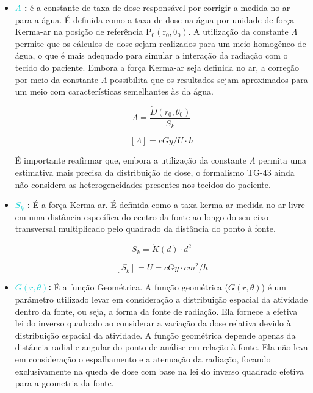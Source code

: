 \documentclass[11pt,a4paper]{article}
\newcounter{exemplo}
\begin{document}
			\begin{exemplo}[onde,]

			\begin{itemize}
				\item \textbf{\textcolor{DarkTurquoise}{$\varLambda$} : } é a constante de taxa de dose responsável por corrigir a medida no ar para a água. É definida como a taxa de dose na água por unidade de força Kerma-ar na posição de referência $\mathrm{P_0(r_0, \theta_0)}$. A utilização da constante $\varLambda$ permite que os cálculos de dose sejam realizados para um meio homogêneo de água, o que é mais adequado para simular a interação da radiação com o tecido do paciente. Embora a força Kerma-ar seja definida no ar, a correção por meio da constante $\varLambda$ possibilita que os resultados sejam aproximados para um meio com características semelhantes às da água.

					\begin{equation}
						\varLambda = \frac{\dot{D}(r_0, \theta_0)}{S_k}
					\end{equation}

					$$[\varLambda] = cGy / U \cdot h$$

				É importante reafirmar que, embora a utilização da constante $\varLambda$ permita uma estimativa mais precisa da distribuição de dose, o formalismo TG-43 ainda não considera as heterogeneidades presentes nos tecidos do paciente.

				\item \textbf{\textcolor{DarkTurquoise}{$S_k$} : } É a força Kerma-ar. É definida como a taxa kerma-ar medida no ar livre em uma distância específica do centro da fonte ao longo do seu eixo transversal multiplicado pelo quadrado da distância do ponto à fonte.

					\begin{equation}
						S_k = \dot{K}(d) \cdot d^2
					\end{equation}

					$$[S_k] = U = cGy \cdot cm^2 / h$$

				\item \textbf{\textcolor{DarkTurquoise}{$G(r, \theta)$}: } É a função Geométrica. 
				A função geométrica ($G(r, \theta)$) é um parâmetro utilizado levar em consideração a distribuição espacial da atividade dentro da fonte, ou seja, a forma da fonte de radiação. Ela fornece a efetiva lei do inverso quadrado ao considerar a variação da dose relativa devido à distribuição espacial da atividade. A função geométrica depende apenas da distância radial e angular do ponto de análise em relação à fonte. Ela não leva em consideração o espalhamento e a atenuação da radiação, focando exclusivamente na queda de dose com base na lei do inverso quadrado efetiva para a geometria da fonte.
				

\end{itemize}
\end{exemplo}
\end{document}
